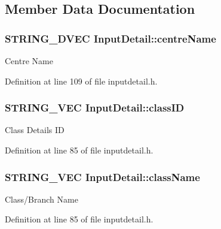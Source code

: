\subsection{\-Member \-Data \-Documentation}
\hypertarget{classInputDetail_a44d0e743d84bfce178975192fc2ddde7}{
\subsubsection[{centre\-Name}]{\setlength{\rightskip}{0pt plus 5cm}\-S\-T\-R\-I\-N\-G\-\_\-D\-V\-E\-C {\bf \-Input\-Detail\-::centre\-Name}}}\label{classInputDetail_a44d0e743d84bfce178975192fc2ddde7}
\-Centre \-Name 

\-Definition at line 109 of file inputdetail.\-h.

\hypertarget{classInputDetail_a67c823f91164f534250751ab8da7b7cf}{
\subsubsection[{class\-I\-D}]{\setlength{\rightskip}{0pt plus 5cm}\-S\-T\-R\-I\-N\-G\-\_\-\-V\-E\-C {\bf \-Input\-Detail\-::class\-I\-D}}}\label{classInputDetail_a67c823f91164f534250751ab8da7b7cf}
\-Class \-Details \-I\-D 

\-Definition at line 85 of file inputdetail.\-h.

\hypertarget{classInputDetail_a6ee80d01e417bea608374ba83e17b425}{
\subsubsection[{class\-Name}]{\setlength{\rightskip}{0pt plus 5cm}\-S\-T\-R\-I\-N\-G\-\_\-\-V\-E\-C {\bf \-Input\-Detail\-::class\-Name}}}\label{classInputDetail_a6ee80d01e417bea608374ba83e17b425}
\-Class/\-Branch \-Name 

\-Definition at line 85 of file inputdetail.\-h.

